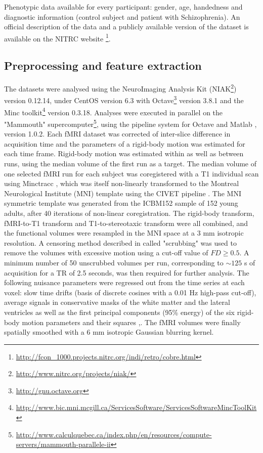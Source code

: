 \documentclass[12pt,journal,compsoc]{IEEEtran}
\begin{document}
Phenotypic data available for every participant: gender, age, handedness and diagnostic information (control subject and patient with Schizophrenia).
An official description of the data and a publicly available version of the dataset is available on the NITRC website \footnote{\url{http://fcon_1000.projects.nitrc.org/indi/retro/cobre.html}}.


\subsection{Preprocessing and feature extraction}
The datasets were analysed using the NeuroImaging Analysis Kit (NIAK\footnote{\url{http://www.nitrc.org/projects/niak/}}) version 0.12.14, under CentOS version 6.3 with Octave\footnote{\url{http://gnu.octave.org}} version 3.8.1 and the Minc toolkit\footnote{\url{http://www.bic.mni.mcgill.ca/ServicesSoftware/ServicesSoftwareMincToolKit}} version 0.3.18. Analyses were executed in parallel on the "Mammouth" supercomputer\footnote{\url{http://www.calculquebec.ca/index.php/en/resources/compute-servers/mammouth-parallele-ii}}, using the pipeline system for Octave and Matlab \cite{Bellec2010}, version 1.0.2. Each fMRI dataset was corrected of inter-slice difference in acquisition time and the parameters of a rigid-body motion was estimated for each time frame. Rigid-body motion was estimated within as well as between runs, using the median volume of the first run as a target. The median volume of one selected fMRI run for each subject was coregistered with a T1 individual scan using Minctracc \cite{Collins1998}, which was itself non-linearly transformed to the Montreal Neurological Institute (MNI) template \cite{Fonov2011} using the CIVET pipeline \cite{Zijdenbos2002}. The MNI symmetric template was generated from the ICBM152 sample of 152 young adults, after 40 iterations of non-linear coregistration. The rigid-body transform, fMRI-to-T1 transform and T1-to-stereotaxic transform were all combined, and the functional volumes were resampled in the MNI space at a 3 mm isotropic resolution. A censoring method described in \cite{Power2012} called "scrubbing" was used to remove the volumes with excessive motion using a cut-off value of $FD\geq0.5$. A minimum number of 50 unscrubbed volumes per run, corresponding to $\sim 125$ s of acquisition for a TR of 2.5 seconds, was then required for further analysis. The following nuisance parameters were regressed out from the time series at each voxel: slow time drifts (basis of discrete cosines with a 0.01 Hz high-pass cut-off), average signals in conservative masks of the white matter and the lateral ventricles as well as the first principal components (95\% energy) of the six rigid-body motion parameters and their squares \cite{Lund2006},\cite{Giove2009}. The fMRI volumes were finally spatially smoothed with a 6 mm isotropic Gaussian blurring kernel. 
\end{document}
